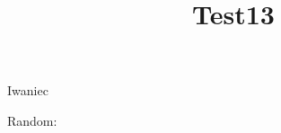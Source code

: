 \documentclass[reqno]{amsart} 
\title{Test13}
\begin{document}
Iwaniec \cite{Iwaniec1992}

Random: \cite{DFI95}


{} 
\end{document}
